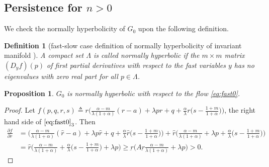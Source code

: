\documentclass[a4paper,11pt]{article}
\newtheorem{proposition}{Proposition}[section]
\newtheorem{definition}{Definition}[section]
\begin{document}
{\subsection{Persistence for $n>0$}
We check the normally hyperbolicity of $G_0$ upon the following definition.
\begin{definition}[fast-slow case definition of normally hyperbolicity of invariant manifold \cite{K}]
A compact set $\Lambda$ is called normally hyperbolic if the $m\times m$ matrix $(D_y f)(p)$ of first partial derivatives with respect to the fast variables $y$ has no eigenvalues with zero real part for all $p \in \Lambda$.
\end{definition}
\begin{proposition} 
$G_0$ is normally hyperbolic with respect to the flow \eqref{eq:fast0}. 
\end{proposition}
\begin{proof}
 Let $f(p,q,r,s) \triangleq r\Big(\frac{\alpha-m}{\lambda(1+\alpha)}(r-a) + \lambda pr + q +\frac{\alpha}{\lambda}r\big(s- \frac{1+m}{1+\alpha}\big)\Big)$, the right hand side of $\eqref{eq:fast0}_3$. Then 
 \begin{align*}
 \frac{\partial f}{\partial r} &= \Big(\frac{\alpha-m}{\lambda(1+\alpha)}(\hat{r}-a) + \lambda p\hat{r} + q +\frac{\alpha}{\lambda}\hat{r}\big(s- \frac{1+m}{1+\alpha}\big)\Big) + \hat{r}\Big(\frac{\alpha-m}{\lambda(1+\alpha)} + \lambda p + \frac{\alpha}{\lambda}\big(s- \frac{1+m}{1+\alpha}\big)\Big)\\
 &= \hat{r}\Big(\frac{\alpha-m}{\lambda(1+\alpha)} + \frac{\alpha}{\lambda}\big(s- \frac{1+m}{1+\alpha}\big) + \lambda p\Big)\ge \underbar{r}\Big(A\underbar{r}\frac{\alpha-m}{\lambda(1+\alpha)} + \lambda p\Big)>0.
 \end{align*}
\end{proof}

}
\end{document}
